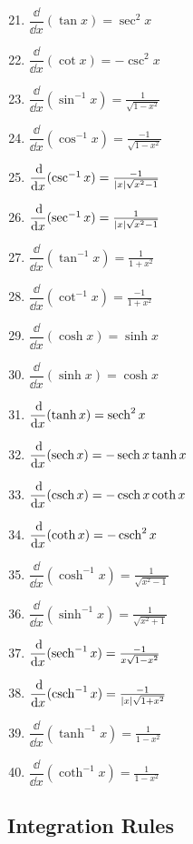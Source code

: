 \parbox{.22\linewidth}{%
\begin{enumerate}\setcounter{enumi}{20}
\item $\dfrac\dd{\dd x}(\tan x)=\sec^2x$
\item $\dfrac\dd{\dd x}(\cot x)=-\csc^2x$
\item $\dfrac\dd{\dd x}(\sin^{-1}x)=\frac1{\sqrt{1-x^2}}$
\item $\dfrac\dd{\dd x}(\cos^{-1}x)=\frac{-1}{\sqrt{1-x^2}}$
\item $\dfrac{\operatorname{d}\!}{\operatorname{d}\! x}(\csc^{-1}x)=\frac{-1}{\left\lvert x \right\rvert\sqrt{x^2-1}}$
\item $\dfrac{\operatorname{d}\!}{\operatorname{d}\! x}(\sec^{-1}x)=\frac1{\left\lvert x \right\rvert\sqrt{x^2-1}}$%
\item $\dfrac\dd{\dd x}(\tan^{-1}x)=\frac1{1+x^2}$
\item $\dfrac\dd{\dd x}(\cot^{-1}x)=\frac{-1}{1+x^2}$
\item $\dfrac\dd{\dd x}(\cosh x)=\sinh x$
\item $\dfrac\dd{\dd x}(\sinh x)=\cosh x$
\end{enumerate}}\hfill
\parbox{.25\linewidth}{%
\begin{enumerate}\setcounter{enumi}{30}
\item $\dfrac{\operatorname{d}\!}{\operatorname{d}\! x}(\tanh x)=\operatorname{sech}^2x$
\item $\dfrac{\operatorname{d}\!}{\operatorname{d}\! x}(\operatorname{sech} x)=-\operatorname{sech} x\tanh x$
\item $\dfrac{\operatorname{d}\!}{\operatorname{d}\! x}(\operatorname{csch} x)=-\operatorname{csch} x\coth x$
\item $\dfrac{\operatorname{d}\!}{\operatorname{d}\! x}(\coth x)=-\operatorname{csch}^2 x$
\item $\dfrac\dd{\dd x}(\cosh^{-1}x)=\frac1{\sqrt{x^2-1}}$
\item $\dfrac\dd{\dd x}(\sinh^{-1}x)=\frac1{\sqrt{x^2+1}}$
\item $\dfrac{\operatorname{d}\!}{\operatorname{d}\! x}(\operatorname{sech}^{-1}x)=\frac{-1}{x\sqrt{1-x^2}}$
\item $\dfrac{\operatorname{d}\!}{\operatorname{d}\! x}(\operatorname{csch}^{-1}x)=\frac{-1}{\left\lvert x \right\rvert\sqrt{1+x^2}}$
\item $\dfrac\dd{\dd x}(\tanh^{-1}x)=\frac1{1-x^2}$
\item $\dfrac\dd{\dd x}(\coth^{-1}x)=\frac1{1-x^2}$
\end{enumerate}}

\vfill

\subsection{Integration Rules}

